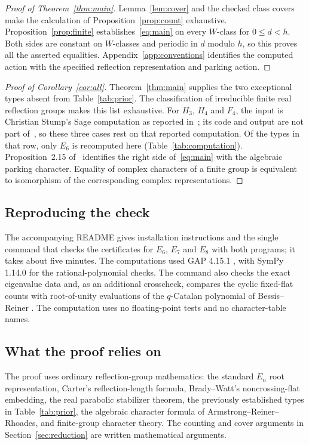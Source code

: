 \documentclass[11pt]{article}
\begin{document}
\begin{proof}[Proof of Theorem~\ref{thm:main}]
Lemma~\ref{lem:cover} and the checked class covers make the
calculation of Proposition~\ref{prop:count} exhaustive.
Proposition~\ref{prop:finite} establishes~\eqref{eq:main} on every
$W$-class for $0\leq d<h$. Both sides are constant on $W$-classes
and periodic in $d$ modulo $h$, so this proves all the asserted
equalities. Appendix~\ref{app:conventions} identifies the computed
action with the specified reflection representation and parking action.
\end{proof}

\begin{proof}[Proof of Corollary~\ref{cor:all}]
Theorem~\ref{thm:main} supplies the two exceptional types absent
from Table~\ref{tab:prior}. The classification of irreducible finite
real reflection groups makes this list exhaustive. For $H_3$, $H_4$
and $F_4$, the input is Christian Stump's Sage computation as reported
in~\cite[Section~2.6, the paragraph after Proposition~2.15]{ARR}; its
code and output are not part of~\cite{ARR}, so these three cases rest
on that reported computation. Of the types in that row, only $E_6$ is
recomputed here (Table~\ref{tab:computation}). Proposition~2.15
of~\cite{ARR} identifies the right side of~\eqref{eq:main} with the
algebraic parking character. Equality of complex characters of a
finite group is equivalent to isomorphism of the corresponding
complex representations.
\end{proof}

\subsection{Reproducing the check}
The accompanying README gives installation instructions and the single
command that checks the certificates for $E_6$, $E_7$ and $E_8$ with
both programs; it takes about five minutes. The computations used GAP
4.15.1 \cite{GAP}, with SymPy 1.14.0 \cite{SymPy} for the
rational-polynomial checks. The command also checks the exact
eigenvalue data and, as an additional crosscheck, compares the cyclic
fixed-flat counts with root-of-unity evaluations of the $q$-Catalan
polynomial of Bessis--Reiner \cite[Theorem~1.1]{BR}. The computation
uses no floating-point tests and no character-table names.

\subsection{What the proof relies on}
The proof uses ordinary reflection-group mathematics: the standard
$E_n$ root representation, Carter's reflection-length formula,
Brady--Watt's noncrossing-flat embedding, the real parabolic stabilizer
theorem, the previously established types in Table~\ref{tab:prior},
the algebraic character formula of Armstrong--Reiner--Rhoades, and
finite-group character theory. The counting and cover arguments in
Section~\ref{sec:reduction} are written mathematical arguments.
\end{document}
